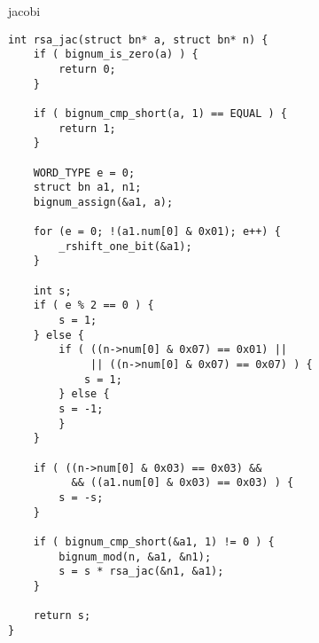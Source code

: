 \begin{algorithm}[H]
	\caption{jacobi}
	\label{alg:jacobi}
	\DontPrintSemicolon
\end{algorithm}

\clearpage

\begin{lstlisting}[basicstyle=\ttfamily\small, backgroundcolor=\color{bgCode}]
int rsa_jac(struct bn* a, struct bn* n) {
    if ( bignum_is_zero(a) ) {
        return 0;
    }
    
    if ( bignum_cmp_short(a, 1) == EQUAL ) {
        return 1;
    }
    
    WORD_TYPE e = 0;
    struct bn a1, n1;
    bignum_assign(&a1, a);
    
    for (e = 0; !(a1.num[0] & 0x01); e++) {
        _rshift_one_bit(&a1);
    }
    
    int s;
    if ( e % 2 == 0 ) {
        s = 1;
    } else {
        if ( ((n->num[0] & 0x07) == 0x01) ||
             || ((n->num[0] & 0x07) == 0x07) ) {
            s = 1;
        } else {
        s = -1;
        }
    }
    
    if ( ((n->num[0] & 0x03) == 0x03) && 
          && ((a1.num[0] & 0x03) == 0x03) ) {
        s = -s;
    }
    
    if ( bignum_cmp_short(&a1, 1) != 0 ) {
        bignum_mod(n, &a1, &n1);
        s = s * rsa_jac(&n1, &a1);
    }
    
    return s;
}
\end{lstlisting}

